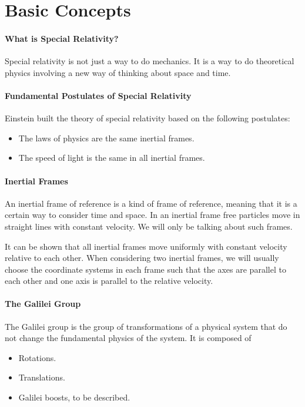 \section{Basic Concepts}

\paragraph{What is Special Relativity?}
Special relativity is not just a way to do mechanics. It is a way to do theoretical physics involving a new way of thinking about space and time.

\paragraph{Fundamental Postulates of Special Relativity}
Einstein built the theory of special relativity based on the following postulates:

\begin{itemize}
	\item The laws of physics are the same inertial frames.
	\item The speed of light is the same in all inertial frames.
\end{itemize}

\paragraph{Inertial Frames}
An inertial frame of reference is a kind of frame of reference, meaning that it is a certain way to consider time and space. In an inertial frame free particles move in straight lines with constant velocity. We will only be talking about such frames.

It can be shown that all inertial frames move uniformly with constant velocity relative to each other. When considering two inertial frames, we will usually choose the coordinate systems in each frame such that the axes are parallel to each other and one axis is parallel to the relative velocity.

\paragraph{The Galilei Group}
The Galilei group is the group of transformations of a physical system that do not change the fundamental physics of the system. It is composed of
\begin{itemize}
	\item Rotations.
	\item Translations.
	\item Galilei boosts, to be described.
\end{itemize}

